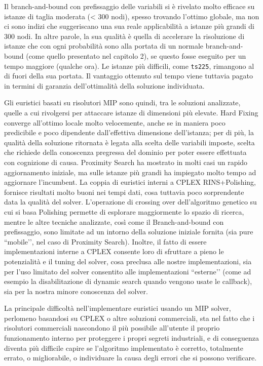 Il branch-and-bound con prefissaggio delle variabili si è rivelato molto efficace su istanze di taglia moderata (< 300 nodi), spesso trovando l’ottimo globale, ma non ci sono indizi che suggeriscano una sua reale applicabilità a istanze più grandi di 300 nodi. In altre parole, la sua qualità è quella di accelerare la risoluzione di istanze che con ogni probabilità sono alla portata di un normale branch-and-bound (come quello presentato nel capitolo 2), se questo fosse eseguito per un tempo maggiore (qualche ora). Le istanze più difficili, come \texttt{ts225}, rimangono al di fuori della sua portata. Il vantaggio ottenuto sul tempo viene tuttavia pagato in termini di garanzia dell’ottimalità della soluzione individuata.

Gli euristici basati su risolutori MIP sono quindi, tra le soluzioni analizzate, quelle a cui rivolgersi per attaccare istanze di dimensioni più elevate. Hard Fixing converge all’ottimo locale molto velocemente, anche se in maniera poco predicibile e poco dipendente dall’effettiva dimensione dell’istanza; per di più, la qualità della soluzione ritornata è legata alla scelta delle variabili imposte, scelta che richiede della conoscenza pregressa del dominio per poter essere effettuata con cognizione di causa. Proximity Search ha mostrato in molti casi un rapido aggiornamento iniziale, ma sulle istanze più grandi ha impiegato molto tempo ad aggiornare l'incumbent. La coppia di euristici interni a CPLEX RINS+Polishing, fornisce risultati molto buoni nei tempi dati, cosa tuttavia poco sorprendente data la qualità del solver. L’operazione di crossing over dell’algoritmo genetico su cui si basa Polishing permette di esplorare maggiormente lo spazio di ricerca, mentre le altre tecniche analizzate, così come il Branch-and-bound con prefissaggio, sono limitate ad un intorno della soluzione iniziale fornita (sia pure ``mobile’’, nel caso di Proximity Search). Inoltre, il fatto di essere implementazioni interne a CPLEX consente loro di sfruttare a pieno le potenzialità e il tuning del solver, cosa preclusa alle nostre implementazioni, sia per l’uso limitato del solver consentito alle implementazioni ``esterne’’ (come ad esempio la disabilitazione di dynamic search quando vengono usate le callback), sia per la nostra minore conoscenza del solver.

La principale difficoltà nell’implementare euristici usando un MIP solver, perlomeno basandosi su CPLEX o altre soluzioni commerciali, sta nel fatto che i risolutori commerciali nascondono il più possibile all’utente il proprio funzionamento interno per proteggere i propri segreti industriali, e di conseguenza diventa più difficile capire se l’algoritmo implementato è corretto, totalmente errato, o migliorabile, o individuare la causa degli errori che si possono verificare.
